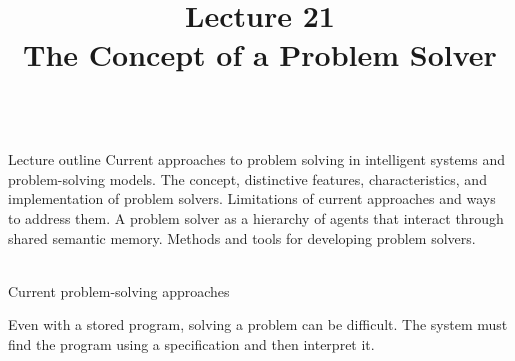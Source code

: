 \title{Lecture 21\\The Concept of a Problem Solver}

\begin{frame}
	\titlepage
\end{frame}

\begin{frame}{\\Lecture outline}
	\topline
	\justifying
	\setlength{\emergencystretch}{2em}
	Current approaches to problem solving in intelligent systems and problem-solving models. The concept, distinctive features, characteristics, and implementation of problem solvers. Limitations of current approaches and ways to address them. A problem solver as a hierarchy of agents that interact through shared semantic memory. Methods and tools for developing problem solvers.
\end{frame}

\begin{frame}{\\Current problem-solving approaches}
	\topline
	\justifying
	\vspace*{\fill}\\
	\footnotesize{
		\begin{SCn}
		\end{SCn}
		Even with a stored program, solving a problem can be difficult. The system must find the program using a specification and then interpret it.
	}

\end{frame}


